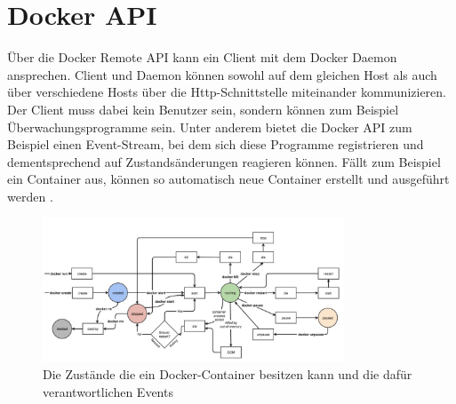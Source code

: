 
\section{Docker API}
Über die Docker Remote API kann ein Client mit dem Docker Daemon ansprechen. Client und Daemon können sowohl auf dem gleichen Host als auch über verschiedene Hosts über die Http-Schnittstelle miteinander kommunizieren. Der Client muss dabei kein Benutzer sein, sondern können zum Beispiel Überwachungsprogramme sein. Unter anderem bietet die Docker API zum Beispiel einen Event-Stream, bei dem sich diese Programme registrieren und dementsprechend auf Zustandsänderungen reagieren können. Fällt zum Beispiel ein Container aus, können so automatisch neue Container erstellt und ausgeführt werden \cite{docker:api}.\\

\begin{figure}[!ht]
  \centering
  \includegraphics[width=0.8\textwidth]{images/13-docker-api.jpg}
  \caption{Die Zustände die ein Docker-Container besitzen kann und die dafür verantwortlichen Events \cite{docker:api}}
\end{figure}


%
%
